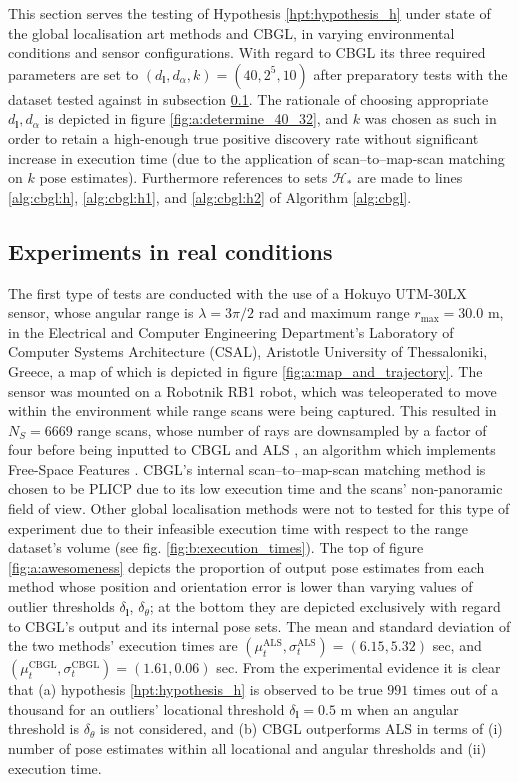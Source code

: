 This section serves the testing of Hypothesis \ref{hpt:hypothesis_h} under
state of the global localisation art methods and CBGL, in varying environmental
conditions and sensor configurations. With regard to CBGL its three required
parameters are set to $(d_{\bm{l}},d_{\alpha},k) = (40, 2^5, 10)$ after
preparatory tests with the dataset tested against in subsection
\ref{subsec:exp_in_re_co}. The rationale of choosing appropriate
$d_{\bm{l}},d_{\alpha}$ is depicted in figure \ref{fig:a:determine_40_32}, and
$k$ was chosen as such in order to retain a high-enough true positive discovery
rate without significant increase in execution time (due to the application of
scan--to--map-scan matching on $k$ pose estimates). Furthermore references to
sets $\mathcal{H}_{\ast}$ are made to lines \ref{alg:cbgl:h},
\ref{alg:cbgl:h1}, and \ref{alg:cbgl:h2} of Algorithm \ref{alg:cbgl}.


\subsection{Experiments in real conditions}
\label{subsec:exp_in_re_co}

The first type of tests are conducted with the use of a Hokuyo UTM-30LX
sensor, whose angular range is $\lambda = 3\pi/2$ rad and maximum range
$r_{\max} = 30.0$ m, in the  Electrical and Computer Engineering Department's
Laboratory of Computer Systems Architecture (CSAL), Aristotle University of
Thessaloniki, Greece, a map of which is depicted in figure
\ref{fig:a:map_and_trajectory}. The sensor was mounted on a Robotnik RB1 robot,
which was teleoperated to move within the environment while range scans were
being captured. This resulted in $N_{S}=6669$ range scans, whose number of rays
are downsampled by a factor of four before being inputted to CBGL and ALS
\cite{als_jp}, an algorithm which implements Free-Space Features
\cite{als_eth}. CBGL's internal scan--to--map-scan matching method is chosen
to be PLICP \cite{Censi2008c} due to its low execution time and the scans'
non-panoramic field of view.  Other global localisation methods were not to
tested for this type of experiment due to their infeasible execution time with
respect to the range dataset's volume (see fig. \ref{fig:b:execution_times}).
The top of figure \ref{fig:a:awesomeness} depicts the proportion of output pose
estimates from each method whose position and orientation error is lower than
varying values of outlier thresholds $\delta_{\bm{l}}$, $\delta_{\theta}$; at
the bottom they are depicted exclusively with regard to CBGL's output and its
internal pose sets. The mean and standard deviation of the two methods'
execution times are $(\mu_t^{\text{ALS}}, \sigma_t^{\text{ALS}}) = (6.15,
5.32)$ sec, and $(\mu_t^{\text{CBGL}}, \sigma_t^{\text{CBGL}}) = (1.61, 0.06)$
sec. From the experimental evidence it is clear that (a) hypothesis
\ref{hpt:hypothesis_h} is observed to be true $991$ times out of a thousand for
an outliers' locational threshold $\delta_{\bm{l}} = 0.5$ m when an angular
threshold is $\delta_{\theta}$ is not considered, and (b) CBGL outperforms ALS
in terms of (i) number of pose estimates within all locational and angular
thresholds and (ii) execution time.

